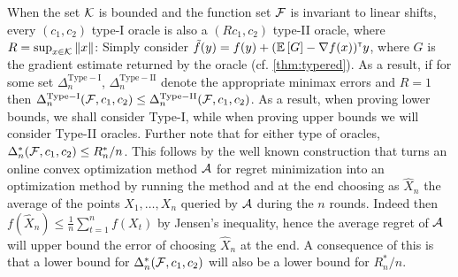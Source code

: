 When the set $\mathcal{K}$ is bounded and the function set $\mathcal{F}$ is invariant to linear shifts, every $(c_1,c_2)$ type-I oracle is also a $(R c_1,c_2)$ type-II oracle,
where $R = \sup_{x\in \mathcal{K}} \|x\|$: Simply consider $\tilde{f}(y) =  f(y) + (\mathbb{E}\left[G\right]-\nabla f(x))^\mathsf{\scriptscriptstyle T} y $, 
where $G$ is the gradient estimate returned by the oracle (cf. \cref{thm:typered}).
As a result, if for some set $\Delta_{n}^{\mathrm{Type-I}}$, $\Delta_{n}^{\mathrm{Type-II}}$ 
denote the appropriate minimax errors and $R=1$
then $\Delta_{n}^{\mathrm{Type-I}}(\mathcal{F},c_1,c_2) \le \Delta_{n}^{\mathrm{Type-II}}(\mathcal{F}, c_1,c_2)  $.
As a result, when proving lower bounds, we shall consider Type-I, while when proving upper bounds we will consider Type-II oracles.
Further note that for either type of oracles, $\Delta_n^*(\mathcal{F},c_1,c_2) \le R_n^*/n$. This follows by the well known construction that turns an online convex optimization method $\mathcal{A}$ for regret minimization into an optimization method by running the method and at the end choosing as $\hat{X}_n$ the average of the points $X_1,\dots,X_n$ queried by $\mathcal{A}$ during the $n$ rounds.
Indeed then $f(\hat{X}_n) \le \frac1n \sum_{t=1}^n f(X_t)$ by Jensen's inequality, hence the average regret of $\mathcal{A}$ will upper bound the error of choosing $\hat{X}_n$ at the end.
A consequence of this is that a lower bound for $\Delta_n^*(\mathcal{F},c_1,c_2) $ will also be a lower bound for $R_n^*/n$.

